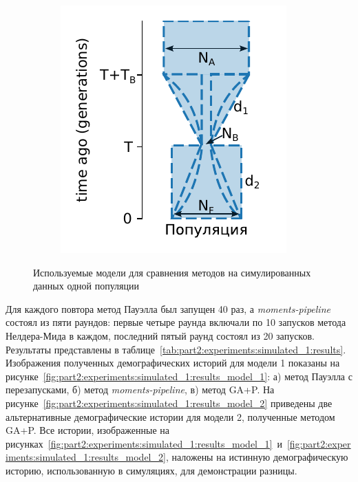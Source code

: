 \begin{figure}[ht]
\begin{subfigure}[b]{.33\textwidth}
    \includegraphics[width=\textwidth]{images_experiments/simulation_1/1pop/picture_1pop_model_2.pdf}
    \caption{}
    \label{fig:part2:experiments:simulated_1:models_2}
    \end{subfigure}
    \caption{Используемые модели для сравнения методов на симулированных данных одной популяции}
    \label{fig:part2:experiments:simulated_1:models}
\end{figure}

Для каждого повтора метод Пауэлла был запущен 40 раз, а \textit{moments-pipeline} состоял из пяти раундов: первые четыре раунда включали по 10 запусков метода Нелдера-Мида в каждом, последний пятый раунд состоял из 20 запусков.
Результаты представлены в таблице~\ref{tab:part2:experiments:simulated_1:results}. Изображения полученных демографических историй для модели 1 показаны на рисунке~\ref{fig:part2:experiments:simulated_1:results_model_1}: а) метод Пауэлла с перезапусками, б) метод \textit{moments-pipeline}, в) метод GA+P.
На рисунке~\ref{fig:part2:experiments:simulated_1:results_model_2} приведены две альтернативные демографические истории для модели 2, полученные методом GA+P.
Все истории, изображенные на рисунках~\ref{fig:part2:experiments:simulated_1:results_model_1}~и~\ref{fig:part2:experiments:simulated_1:results_model_2}, наложены на истинную демографическую историю, использованную в симуляциях, для демонстрации разницы.


